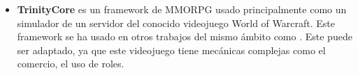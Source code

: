 \begin{itemize}
    \item \textbf{TrinityCore} es un framework de MMORPG usado principalmente como un simulador de un servidor del conocido videojuego World of Warcraft. Este framework se ha usado en otros trabajos del mismo ámbito como \cite {wow-upc}. Este puede ser adaptado, ya que este videojuego tiene mecánicas complejas como el comercio, el uso de roles.
\end{itemize}
